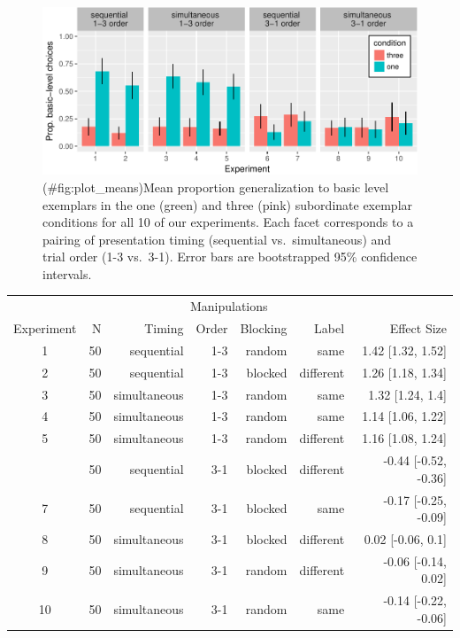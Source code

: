 \documentclass[english,floatsintext,man]{apa6}
\theoremstyle{definition}
\theoremstyle{definition}
\theoremstyle{remark}
\begin{document}
\begin{figure}
\centering
\includegraphics{xtmem_files/figure-latex/plot_means-1.pdf}
\caption{(\#fig:plot\_means)Mean proportion generalization to basic
level exemplars in the one (green) and three (pink) subordinate exemplar
conditions for all 10 of our experiments. Each facet corresponds to a
pairing of presentation timing (sequential vs.~simultaneous) and trial
order (1-3 vs.~3-1). Error bars are bootstrapped 95\% confidence
intervals.}
\end{figure}

\begin{table}[!h]
\centering\begingroup\fontsize{12}{14}\selectfont

\begin{tabular}{crrrrrr}
\toprule
\multicolumn{2}{c}{ } & \multicolumn{4}{c}{Manipulations} & \multicolumn{1}{c}{ } \\
\cmidrule(l{2pt}r{2pt}){3-6}
Experiment & N & Timing & Order & Blocking & Label & Effect Size\\
\midrule
1 & 50 & sequential & 1-3 & random & same & 1.42 [1.32, 1.52]\\
2 & 50 & sequential & 1-3 & blocked & different & 1.26 [1.18, 1.34]\\
3 & 50 & simultaneous & 1-3 & random & same & 1.32 [1.24, 1.4]\\
4 & 50 & simultaneous & 1-3 & random & same & 1.14 [1.06, 1.22]\\
5 & 50 & simultaneous & 1-3 & random & different & 1.16 [1.08, 1.24]\\
\addlinespace
6 & 50 & sequential & 3-1 & blocked & different & -0.44 [-0.52, -0.36]\\
7 & 50 & sequential & 3-1 & blocked & same & -0.17 [-0.25, -0.09]\\
8 & 50 & simultaneous & 3-1 & blocked & different & 0.02 [-0.06, 0.1]\\
9 & 50 & simultaneous & 3-1 & random & different & -0.06 [-0.14, 0.02]\\
10 & 50 & simultaneous & 3-1 & random & same & -0.14 [-0.22, -0.06]\\
\bottomrule
\end{tabular}\endgroup
\end{table}
\end{document}
